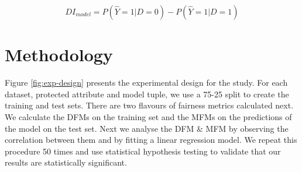 \documentclass{article}
\begin{document}
\begin{equation}
  DI_{model} = P(\hat{Y}=1|D=0)-P(\hat{Y}=1|D=1)
  \label{eq:spd-model}
\end{equation}


\section{Methodology}\label{sec:method}




Figure \ref{fig:exp-design} presents the experimental design for the
study. For each dataset, protected attribute and model tuple, we use a
75-25 split to create the training and test sets. There are two
flavours of fairness metrics calculated next. We calculate the DFMs on
the training set and the MFMs on the predictions of the model on the
test set. Next we analyse the DFM & MFM by observing the correlation
between them and by fitting a linear regression model. We repeat this
procedure 50 times and use statistical hypothesis testing to validate
that our results are statistically significant.
\end{document}

